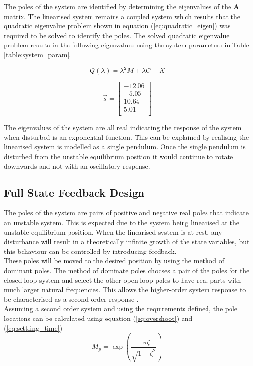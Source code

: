 The poles of the system are identified by determining the eigenvalues of the $\boldsymbol{A}$ matrix. The linearised system remains a coupled system which results that the quadratic eigenvalue problem shown in equation (\ref{eq:quadratic_eigen}) was required to be solved to identify the poles. The solved quadratic eigenvalue problem results in the following eigenvalues using the system parameters in Table \ref{table:system_param}.

\begin{equation} \label{eq:quadratic_eigen}
Q(\lambda) =\lambda^{2}M + \lambda C + K
\end{equation}

$$
\vec{s} = 
\begin{bmatrix}
-12.06 \\
-5.05 \\
10.64 \\
5.01 \\
\end{bmatrix}
$$

The eigenvalues of the system are all real indicating the response of the system when disturbed is an exponential function. This can be explained by realising the linearised system is modelled as a single pendulum. Once the single pendulum is disturbed from the unstable equilibrium position it would continue to rotate downwards and not with an oscillatory response. 


\subsection{Full State Feedback Design}
The poles of the system are pairs of positive and negative real poles that indicate an unstable system. This is expected due to the system being linearised at the unstable equilibrium position. When the linearised system is at rest, any disturbance will result in a theoretically infinite growth of the state variables, but this behaviour can be controlled by introducing feedback. \\

These poles will be moved to the desired position by using the method of dominant poles. The method of dominate poles chooses a pair of the poles for the closed-loop system and select the other open-loop poles to have real parts with much larger natural frequencies. This allows the higher-order system response to be characterised as a second-order response \citep{textbook}. \\

Assuming a second order system and using the requirements defined, the pole locations can be calculated using equation (\ref{eq:overshoot}) and (\ref{eq:settling_time})
\begin{equation} \label{eq:overshoot}
M_{p} = \exp(\frac{-\pi \zeta}{ \sqrt{1-\zeta^2}})
\end{equation}

